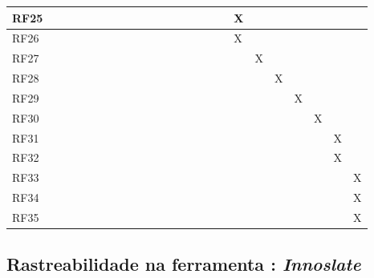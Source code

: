 \begin{table}[H]
\begin{tabular}{|l|l|l|l|l|l|l|l|l|l|l|l|l|l|l|l|l|l|l|l|l|l|l|l|}
RF25&      &      &      &      &      &      &      &      &      &      &      &      &      &      &      &      &   X   &      &      &      &      &      &      \\ \hline
RF26&      &      &      &      &      &      &      &      &      &      &      &      &      &      &      &      &   X   &      &      &      &      &      &      \\ \hline
RF27&      &      &      &      &      &      &      &      &      &      &      &      &      &      &      &      &      &   X   &      &      &      &      &      \\ \hline
RF28&      &      &      &      &      &      &      &      &      &      &      &      &      &      &      &      &      &      &   X   &      &      &      &      \\ \hline
RF29&      &      &      &      &      &      &      &      &      &      &      &      &      &      &      &      &      &      &      &   X   &      &      &      \\ \hline
RF30&      &      &      &      &      &      &      &      &      &      &      &      &      &      &      &      &      &      &      &      &   X   &      &      \\ \hline
RF31&      &      &      &      &      &      &      &      &      &      &      &      &      &      &      &      &      &      &      &      &      &  X    &      \\ \hline
RF32&      &      &      &      &      &      &      &      &      &      &      &      &      &      &      &      &      &      &      &      &      &   X   &      \\ \hline
RF33&      &      &      &      &      &      &      &      &      &      &      &      &      &      &      &      &      &      &      &      &      &      &  X    \\ \hline
RF34&      &      &      &      &      &      &      &      &      &      &      &      &      &      &      &      &      &      &      &      &      &      &  X    \\ \hline
RF35&      &      &      &      &      &      &      &      &      &      &      &      &      &      &      &      &      &      &      &      &      &      &  X    \\ \hline
\end{tabular}
\end{table}

\subsection{Rastreabilidade na ferramenta : \textit{Innoslate} }

